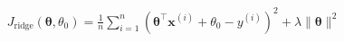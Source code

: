 \documentclass[preview]{standalone}
\begin{document}
\begin{align*}
J_{\text{ridge}}(\mathbf{\theta}, \theta_0) = \frac{1}{n} \sum_{i=1}^n \left(\mathbf{\theta}^{\top}\mathbf{x}^{(i)} + \theta_0 - y^{(i)}\right)^2 + \lambda \|\mathbf{\theta}\|^2
\end{align*}
\end{document}
